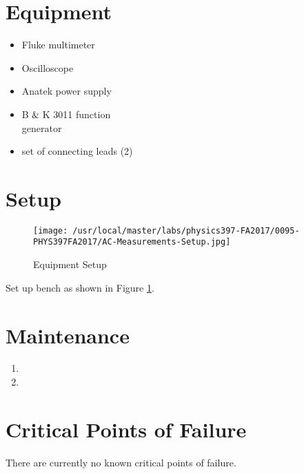 \section{Equipment}

\begin{minipage}[t]{0.55\textwidth}
\begin{itemize}[noitemsep]
\item Fluke multimeter
\item Oscilloscope
\item Anatek power supply
\end{itemize}
\end{minipage}
\begin{minipage}[t]{0.45\textwidth}
\begin{itemize}[noitemsep]
\item B$\And$K 3011 function \\generator
\item set of connecting leads (2)
\end{itemize}
\end{minipage}


\section{Setup}
\begin{figure}
\texttt{[image: /usr/local/master/labs/physics397-FA2017/0095-PHYS397FA2017/AC-Measurements-Setup.jpg]}
\caption{Equipment Setup}
\label{pic:ACsetup}
\end{figure}

Set up bench as shown in Figure \ref{pic:ACsetup}.

\section{Maintenance}

\begin{enumerate}
\item 
\item 
\end{enumerate}

\section{Critical Points of Failure}

There are currently no known critical points of failure.

